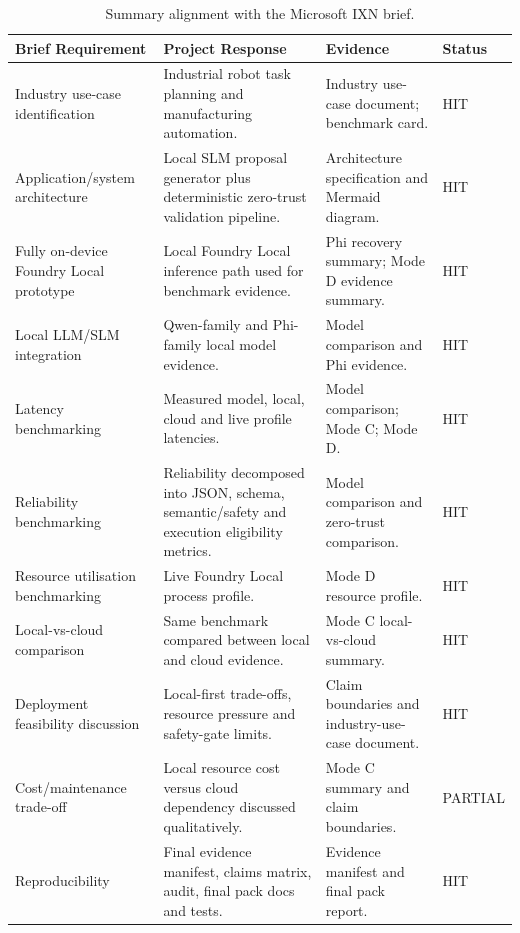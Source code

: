 \documentclass[sigconf,nonacm]{acmart}
\begin{document}
\begin{table}[t]
\centering
\caption{Summary alignment with the Microsoft IXN brief.}
\label{tab:microsoft_brief_alignment}
\footnotesize
\begin{tabularx}{\textwidth}{L{0.22\textwidth}Y Y L{0.12\textwidth}}
\toprule
Brief Requirement & Project Response & Evidence & Status \\
\midrule
Industry use-case identification & Industrial robot task planning and manufacturing automation. & Industry use-case document; benchmark card. & HIT \\
Application/system architecture & Local SLM proposal generator plus deterministic zero-trust validation pipeline. & Architecture specification and Mermaid diagram. & HIT \\
Fully on-device Foundry Local prototype & Local Foundry Local inference path used for benchmark evidence. & Phi recovery summary; Mode D evidence summary. & HIT \\
Local LLM/SLM integration & Qwen-family and Phi-family local model evidence. & Model comparison and Phi evidence. & HIT \\
Latency benchmarking & Measured model, local, cloud and live profile latencies. & Model comparison; Mode C; Mode D. & HIT \\
Reliability benchmarking & Reliability decomposed into JSON, schema, semantic/safety and execution eligibility metrics. & Model comparison and zero-trust comparison. & HIT \\
Resource utilisation benchmarking & Live Foundry Local process profile. & Mode D resource profile. & HIT \\
Local-vs-cloud comparison & Same benchmark compared between local and cloud evidence. & Mode C local-vs-cloud summary. & HIT \\
Deployment feasibility discussion & Local-first trade-offs, resource pressure and safety-gate limits. & Claim boundaries and industry-use-case document. & HIT \\
Cost/maintenance trade-off & Local resource cost versus cloud dependency discussed qualitatively. & Mode C summary and claim boundaries. & PARTIAL \\
Reproducibility & Final evidence manifest, claims matrix, audit, final pack docs and tests. & Evidence manifest and final pack report. & HIT \\
\bottomrule
\end{tabularx}
\end{table}
\end{document}
